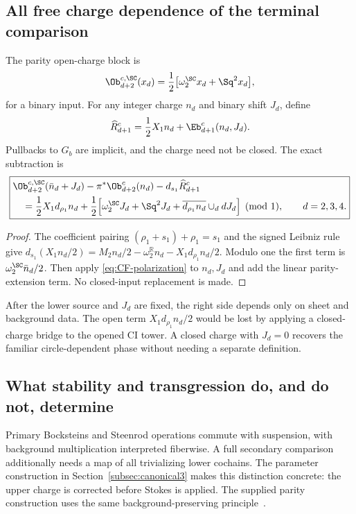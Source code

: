 \subsection{All free charge dependence of the terminal comparison}\label{subsec:open-charge-map}
The parity open-charge block is
\begin{equation}\label{eq:parity-CF}
 \Ob^{c,\SC}_{d+2}(x_d)
 =\frac12\big[\omega_2^{\SC}x_d+\Sq^2x_d\big],
\end{equation}
for a binary input. For any integer charge $n_d$ and binary shift $J_d$, define
\begin{equation}\label{eq:open-charge-rephasing}
 \widehat R^{c}_{d+1}
 =\frac12X_1n_d+\Eb^c_{d+1}(n_d,J_d).
\end{equation}
Pullbacks to $G_b$ are implicit, and the charge need not be closed. The exact subtraction is
\begin{equation}\label{eq:open-charge-subtraction}
 \boxed{\begin{aligned}
 &\Ob^{c,\SC}_{d+2}(\bar n_d+J_d)
   -\pi^*\Ob^c_{d+2}(n_d)-d_{s_1}\widehat R^{c}_{d+1}\\
 &\quad=\frac12X_1d_{\rho_1}n_d
  +\frac12\Big[\omega_2^{\SC}J_d+\Sq^2J_d
       +\overline{d_{\rho_1}n_d}\cup_d dJ_d\Big]\pmod1,
 \qquad d=2,3,4.
 \end{aligned}}
\end{equation}
\begin{proof}
The coefficient pairing $(\rho_1+s_1)+\rho_1=s_1$ and the signed Leibniz rule give
$d_{s_1}(X_1n_d/2)=M_2n_d/2-\omega_2^{\mathbb R}n_d-X_1d_{\rho_1}n_d/2$.
Modulo one the first term is $\omega_2^{\SC}\bar n_d/2$.
Then apply \eqref{eq:CF-polarization} to $n_d,J_d$ and add the linear parity-extension term. No closed-input replacement is made.
\end{proof}
After the lower source and $J_d$ are fixed, the right side depends only on sheet and background data. The open term $X_1d_{\rho_1}n_d/2$ would be lost by applying a closed-charge bridge to the opened CI tower. A closed charge with $J_d=0$ recovers the familiar circle-dependent phase without needing a separate definition.

\subsection{What stability and transgression do, and do not, determine}
Primary Bocksteins and Steenrod operations commute with suspension, with background multiplication interpreted fiberwise. A full secondary comparison additionally needs a map of all trivializing lower cochains. The parameter construction in Section~\ref{subsec:canonical3} makes this distinction concrete: the upper charge is corrected before Stokes is applied. The supplied parity construction uses the same background-preserving principle~\cite[Appendix F.6]{Project4}.

